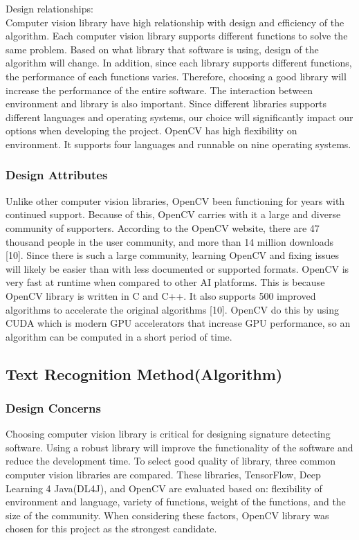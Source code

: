 \documentclass[onecolumn, draftclsnofoot,10pt, compsoc]{IEEEtran}
\begin{document}
Design relationships: \\
Computer vision library have high relationship with design and efficiency of the algorithm. Each computer vision library supports different functions to solve the same problem.  Based on what library that software is using, design of the algorithm will change. In addition, since each library supports different functions, the performance of each functions varies. Therefore, choosing a good library will increase the performance of the entire software.
The interaction between environment and library is also important.  Since different libraries supports different languages and operating systems, our choice will significantly impact our options when developing the project. OpenCV has high flexibility on environment. It supports four languages and runnable on nine operating systems.\\

\subsubsection{Design Attributes}
Unlike other computer vision libraries, OpenCV been functioning for years with continued support. Because of this, OpenCV carries with it a large and diverse community of supporters. According to the OpenCV website, there are 47 thousand people in the user community, and more than 14 million downloads [10]. Since there is such a large community, learning OpenCV and fixing issues will likely be easier than with less documented or supported formats.
OpenCV is very fast at runtime when compared to other AI platforms. This is because OpenCV library is written in C and C++. It also supports 500 improved algorithms to accelerate the original algorithms [10].  OpenCV do this by using CUDA which is modern GPU accelerators that increase GPU performance, so an algorithm can be computed in a short period of time.\\

\subsection{Text Recognition Method(Algorithm)}
\subsubsection{Design Concerns}
Choosing computer vision library is critical for designing signature detecting software. Using a robust library will improve the functionality of the software and reduce the development time. To select good quality of library, three common computer vision libraries are compared. These libraries, TensorFlow, Deep Learning 4 Java(DL4J), and OpenCV are evaluated based on: flexibility of environment and language, variety of functions, weight of the functions, and the size of the community. When considering these factors, OpenCV library was chosen for this project as the strongest candidate.
\end{document}

